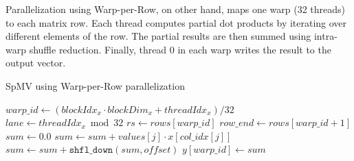 \documentclass[conference]{IEEEtran}
\begin{document}
Parallelization using Warp-per-Row, on other hand, maps one warp (32 threads) to each matrix row. Each thread computes partial dot products by iterating over different elements of the row. The partial results are then summed using intra-warp shuffle reduction. Finally, thread 0 in each warp writes the result to the output vector.

\begin{algorithm}[ht]
\caption{SpMV using Warp-per-Row parallelization}
\begin{algorithmic}[1]
    \State $warp\_id \gets \left(blockIdx_x \cdot blockDim_x + threadIdx_x\right) / 32$
    \State $lane \gets threadIdx_x \bmod 32$
        \State $rs \gets rows[warp\_id]$
        \State $row\_end \gets rows[warp\_id + 1]$
        \State $sum \gets 0.0$
            \State $sum \gets sum + values[j] \cdot x[col\_idx[j]]$
        \EndFor
            \State $sum \gets sum + \texttt{shfl\_down}(sum, offset)$
        \EndFor
            \State $y[warp\_id] \gets sum$
        \EndIf
    \EndIf
\EndProcedure
\end{algorithmic}
\end{algorithm}
\end{document}
